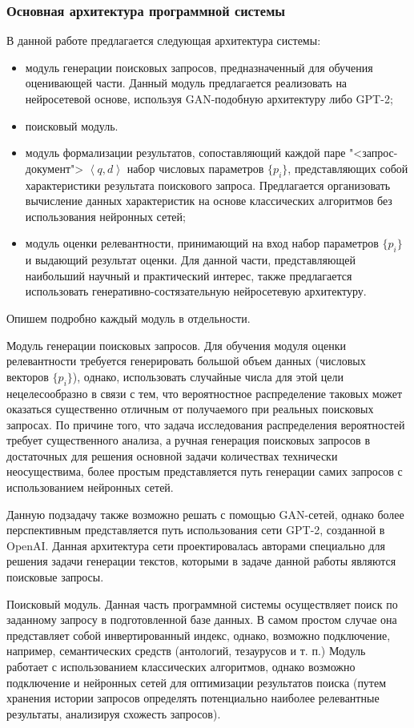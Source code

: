 \subsubsection{Основная архитектура программной системы}
В данной работе предлагается следующая архитектура системы:
\begin{itemize}
\item модуль генерации поисковых запросов, предназначенный для обучения оценивающей части. Данный модуль предлагается
реализовать на нейросетевой основе, используя GAN-подобную архитектуру либо GPT-2;
\item поисковый модуль.
\item модуль формализации результатов, сопоставляющий каждой паре "<запрос-документ"> $\left\langle q, d \right\rangle$ набор числовых параметров
$\{p_i\}$, представляющих собой характеристики результата поискового запроса. Предлагается организовать вычисление данных характеристик на основе
классических алгоритмов без использования нейронных сетей;
\item модуль оценки релевантности, принимающий на вход набор параметров $\{p_i\}$ и выдающий результат оценки. Для данной части, представляющей 
наибольший научный и практический интерес, также предлагается использовать генеративно-состязательную нейросетевую архитектуру.
\end{itemize}
Опишем подробно каждый модуль в отдельности.

Модуль генерации поисковых запросов. Для обучения модуля оценки релевантности требуется генерировать большой объем данных (числовых векторов $\{p_i\}$),
однако, использовать случайные числа для этой цели нецелесообразно в связи с тем, что вероятностное распределение таковых может оказаться существенно
отличным от получаемого при реальных поисковых запросах. По причине того, что задача исследования распределения вероятностей требует существенного анализа,
а ручная генерация поисковых запросов в достаточных для решения основной задачи количествах технически неосуществима, более простым представляется путь 
генерации самих запросов с использованием нейронных сетей.

Данную подзадачу также возможно решать с помощью GAN-сетей, однако более перспективным представляется путь использования сети GPT-2, созданной в OpenAI.
Данная архитектура сети проектировалась авторами специально для решения задачи генерации текстов, которыми в задаче данной работы являются поисковые запросы.

Поисковый модуль. Данная часть программной системы осуществляет поиск по заданному запросу в подготовленной базе данных. В самом простом случае она
представляет собой инвертированный индекс, однако, возможно подключение, например, семантических средств (антологий, тезаурусов и т. п.) Модуль работает с
использованием классических алгоритмов, однако возможно подключение и нейронных сетей для оптимизации результатов поиска (путем хранения истории запросов
определять потенциально наиболее релевантные результаты, анализируя схожесть запросов).

